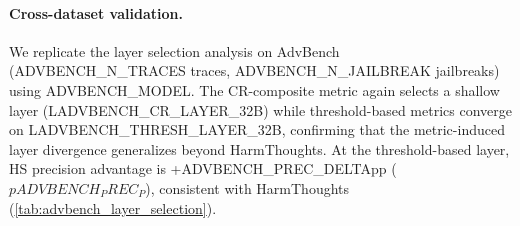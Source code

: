 



\paragraph{Cross-dataset validation.}
We replicate the layer selection analysis on AdvBench~\citep{advbench} ({{ADVBENCH_N_TRACES}} traces, {{ADVBENCH_N_JAILBREAK}} jailbreaks) using {{ADVBENCH_MODEL}}. The CR-composite metric again selects a shallow layer (L{{ADVBENCH_CR_LAYER_32B}}) while threshold-based metrics converge on L{{ADVBENCH_THRESH_LAYER_32B}}, confirming that the metric-induced layer divergence generalizes beyond HarmThoughts. At the threshold-based layer, HS precision advantage is +{{ADVBENCH_PREC_DELTA}}pp ($p{{ADVBENCH_PREC_P}}$), consistent with HarmThoughts (\cref{tab:advbench_layer_selection}).


